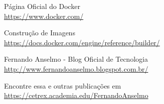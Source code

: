 \documentclass[a4paper,11pt]{article}
\begin{document}
\begin{thebibliography}{4}

  Página Oficial do Docker \\
  \url{https://www.docker.com/}
  
  Construção de Imagens \\
  \url{https://docs.docker.com/engine/reference/builder/}

  Fernando Anselmo - Blog Oficial de Tecnologia \\
  \url{http://www.fernandoanselmo.blogspot.com.br/}

  Encontre essa e outras publicações em \\
  \url{https://cetrex.academia.edu/FernandoAnselmo}

\end{thebibliography}
  
\end{document}
